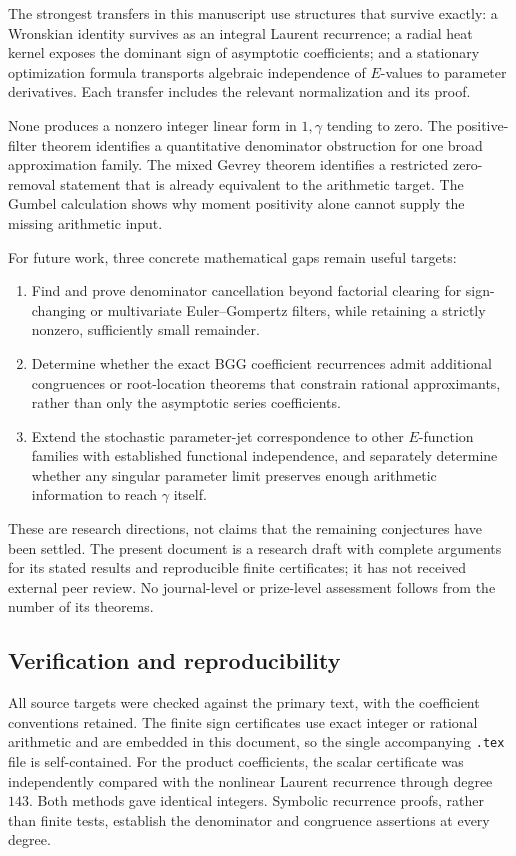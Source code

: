 \documentclass[11pt,a4paper]{article}
\theoremstyle{definition}
\theoremstyle{remark}
\numberwithin{equation}{section}
\begin{document}
The strongest transfers in this manuscript use structures that survive
exactly: a Wronskian identity survives as an integral Laurent recurrence;
a radial heat kernel exposes the dominant sign of asymptotic coefficients;
and a stationary optimization formula transports algebraic independence
of $E$-values to parameter derivatives. Each transfer includes the relevant
normalization and its proof.

None produces a nonzero integer linear form in $1,\gamma$ tending to
zero. The positive-filter theorem identifies a quantitative denominator
obstruction for one broad approximation family. The mixed Gevrey theorem
identifies a restricted zero-removal statement that is already equivalent
to the arithmetic target. The Gumbel calculation shows why moment
positivity alone cannot supply the missing arithmetic input.

For future work, three concrete mathematical gaps remain useful targets:
\begin{enumerate}
\item Find and prove denominator cancellation beyond factorial clearing
for sign-changing or multivariate Euler--Gompertz filters, while retaining
a strictly nonzero, sufficiently small remainder.
\item Determine whether the exact BGG coefficient recurrences admit
additional congruences or root-location theorems that constrain rational
approximants, rather than only the asymptotic series coefficients.
\item Extend the stochastic parameter-jet correspondence to other
$E$-function families with established functional independence, and
separately determine whether any singular parameter limit preserves
enough arithmetic information to reach $\gamma$ itself.
\end{enumerate}
These are research directions, not claims that the remaining conjectures
have been settled. The present document is a research draft with complete
arguments for its stated results and reproducible finite certificates;
it has not received external peer review. No journal-level or prize-level
assessment follows from the number of its theorems.

\subsection{Verification and reproducibility}
All source targets were checked against the primary text, with the
coefficient conventions retained. The finite sign certificates use exact
integer or rational arithmetic and are embedded in this document, so the
single accompanying \texttt{.tex} file is self-contained. For the product
coefficients, the scalar certificate was independently compared with the
nonlinear Laurent recurrence through degree $143$. Both methods gave
identical integers. Symbolic recurrence proofs, rather than finite tests,
establish the denominator and congruence assertions at every degree.
\end{document}
